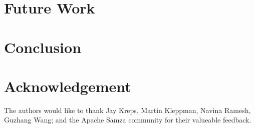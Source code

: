 \documentclass[10pt, conference, compsocconf]{IEEEtran}
\begin{document}
\section{Future Work}

\section{Conclusion}

\section{Acknowledgement}

The authors would like to thank Jay Kreps, Martin Kleppman, Navina Ramesh, Guzhang Wang; and the Apache Samza community for their valueable feedback.




\end{document}
